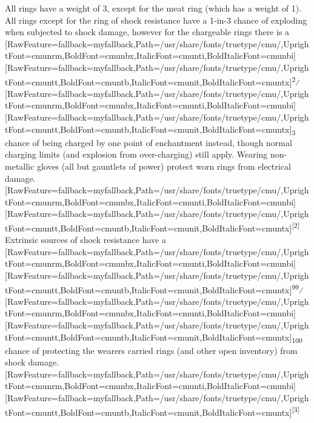 All rings have a weight of 3, except for the meat ring\footnotemark[32] (which has a weight of 1). All rings except for the ring of shock resistance\footnotemark[33] have a 1-{}in-{}3 chance of exploding when subjected to shock\footnotemark[34] damage, however for the chargeable rings there is a \allowbreak{}\setmainfont{cmunrm.ttf}[RawFeature={fallback=myfallback},Path=/usr/share/fonts/truetype/cmu/,UprightFont=cmunrm,BoldFont=cmunbx,ItalicFont=cmunti,BoldItalicFont=cmunbi]\setmonofont{cmunrm.ttf}[RawFeature={fallback=myfallback},Path=/usr/share/fonts/truetype/cmu/,UprightFont=cmuntt,BoldFont=cmuntb,ItalicFont=cmunit,BoldItalicFont=cmuntx]\textsuperscript{2}⁄\allowbreak{}\setmainfont{cmunrm.ttf}[RawFeature={fallback=myfallback},Path=/usr/share/fonts/truetype/cmu/,UprightFont=cmunrm,BoldFont=cmunbx,ItalicFont=cmunti,BoldItalicFont=cmunbi]\setmonofont{cmunrm.ttf}[RawFeature={fallback=myfallback},Path=/usr/share/fonts/truetype/cmu/,UprightFont=cmuntt,BoldFont=cmuntb,ItalicFont=cmunit,BoldItalicFont=cmuntx]\textsubscript{3} chance of being charged by one point of enchantment instead, though normal charging limits (and explosion from over-{}charging) still apply. Wearing non-{}metallic gloves\footnotemark[35] (all but gauntlets of power) protect worn rings from electrical damage.\allowbreak{}\setmainfont{cmunrm.ttf}[RawFeature={fallback=myfallback},Path=/usr/share/fonts/truetype/cmu/,UprightFont=cmunrm,BoldFont=cmunbx,ItalicFont=cmunti,BoldItalicFont=cmunbi]\setmonofont{cmunrm.ttf}[RawFeature={fallback=myfallback},Path=/usr/share/fonts/truetype/cmu/,UprightFont=cmuntt,BoldFont=cmuntb,ItalicFont=cmunit,BoldItalicFont=cmuntx]\textsuperscript{{$\text{[}$}2{$\text{]}$}} Extrinsic sources of shock resistance\footnotemark[36] have a \allowbreak{}\setmainfont{cmunrm.ttf}[RawFeature={fallback=myfallback},Path=/usr/share/fonts/truetype/cmu/,UprightFont=cmunrm,BoldFont=cmunbx,ItalicFont=cmunti,BoldItalicFont=cmunbi]\setmonofont{cmunrm.ttf}[RawFeature={fallback=myfallback},Path=/usr/share/fonts/truetype/cmu/,UprightFont=cmuntt,BoldFont=cmuntb,ItalicFont=cmunit,BoldItalicFont=cmuntx]\textsuperscript{99}⁄\allowbreak{}\setmainfont{cmunrm.ttf}[RawFeature={fallback=myfallback},Path=/usr/share/fonts/truetype/cmu/,UprightFont=cmunrm,BoldFont=cmunbx,ItalicFont=cmunti,BoldItalicFont=cmunbi]\setmonofont{cmunrm.ttf}[RawFeature={fallback=myfallback},Path=/usr/share/fonts/truetype/cmu/,UprightFont=cmuntt,BoldFont=cmuntb,ItalicFont=cmunit,BoldItalicFont=cmuntx]\textsubscript{100} chance of protecting the wearer\textquotesingle{}s carried rings (and other open inventory) from shock damage.\allowbreak{}\setmainfont{cmunrm.ttf}[RawFeature={fallback=myfallback},Path=/usr/share/fonts/truetype/cmu/,UprightFont=cmunrm,BoldFont=cmunbx,ItalicFont=cmunti,BoldItalicFont=cmunbi]\setmonofont{cmunrm.ttf}[RawFeature={fallback=myfallback},Path=/usr/share/fonts/truetype/cmu/,UprightFont=cmuntt,BoldFont=cmuntb,ItalicFont=cmunit,BoldItalicFont=cmuntx]\textsuperscript{{$\text{[}$}3{$\text{]}$}}



